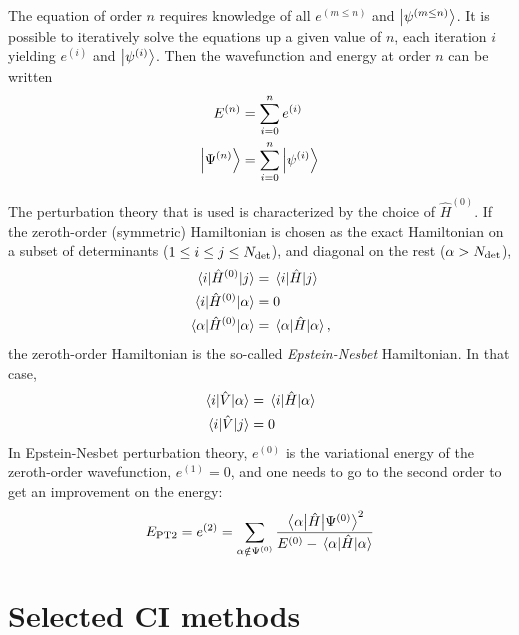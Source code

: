 \documentclass[./thesis.tex]{subfiles}
\begin{document}
The equation of order $n$ requires knowledge of all $e^{(m \leq n)}$ and $\ket {\psi^{(m \leq n)}}$. It is possible to iteratively solve the equations up a given value of $n$, each iteration $i$ yielding $e^{(i)}$ and $\ket {\psi^{(i)}}$. Then the wavefunction and energy at order $n$ can be written
\begin{align}
E^{(n)} &=\sum_{i=0}^n e^{(i)} \\
\ket {\Psi^{(n)}} &= \sum_{i=0}^n \ket {\psi^{(i)}}
\end{align}

The perturbation theory that is used is characterized by the choice of $\hat{H}^{(0)}$.
If the zeroth-order (symmetric) Hamiltonian is chosen as the exact Hamiltonian on a subset of determinants ($1 \le i \le j \le {N_\text{det}}$), and diagonal on the rest ($\alpha > {N_\text{det}}$), 
\begin{align}
\mel{i}{\hat{H}^{(0)}}{j} & = \mel{i}{\hat{H}}{j} \\
\mel{i}{\hat{H}^{(0)}}{\alpha} & = 0 \\
\mel{\alpha}{\hat{H}^{(0)}}{\alpha} & = \mel{\alpha}{\hat{H}}{\alpha}, \\
\end{align}
the zeroth-order Hamiltonian is the so-called \emph{Epstein-Nesbet} Hamiltonian. In that case,
\begin{align}
\mel{i}{\hat{V}}{\alpha} & = \mel{i}{\hat{H}}{\alpha} \\
\mel{i}{\hat{V}}{j} & = 0 \\
\end{align}
In Epstein-Nesbet perturbation theory, $e^{(0)}$ is the variational energy of
the zeroth-order wavefunction, $e^{(1)} = 0$, and one needs to go to the second
order to get an improvement on the energy:
\begin{equation}
E_\text{PT2} = e^{(2)} = \sum_{\alpha \notin \Psi^{(0)}} \frac{\mel{\alpha}{\hat{H}}{\Psi^{(0)}}^2}{E^{(0)} - \mel{\alpha}{\hat{H}}{\alpha}}
\end{equation}



\section{Selected CI methods}
\end{document}

